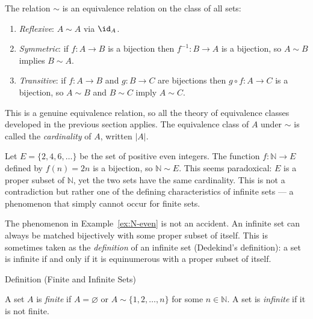 \begin{remark*}
The relation $\sim$ is an equivalence relation on the class of all sets:
\begin{enumerate}[label=(\roman*)]
\item \emph{Reflexive}: $A \sim A$ via $\id_A$.
\item \emph{Symmetric}: if $f : A \to B$ is a bijection then $f^{-1} : B \to A$
is a bijection, so $A \sim B$ implies $B \sim A$.
\item \emph{Transitive}: if $f : A \to B$ and $g : B \to C$ are bijections then
$g \circ f : A \to C$ is a bijection, so $A \sim B$ and $B \sim C$ imply $A \sim C$.
\end{enumerate}
This is a genuine equivalence relation, so all the theory of equivalence classes
developed in the previous section applies. The equivalence class of $A$ under
$\sim$ is called the \emph{cardinality} of $A$, written $|A|$.
\end{remark*}

\begin{example*}
\label{ex:N-even}
Let $E = \{2, 4, 6, \dots\}$ be the set of positive even integers. The
function $f : \mathbb{N} \to E$ defined by $f(n) = 2n$ is a bijection, so
$\mathbb{N} \sim E$. This seems paradoxical: $E$ is a proper subset of
$\mathbb{N}$, yet the two sets have the same cardinality. This is not a
contradiction but rather one of the defining characteristics of infinite sets
--- a phenomenon that simply cannot occur for finite sets.
\end{example*}

\begin{remark*}
The phenomenon in Example~\ref{ex:N-even} is not an accident. An infinite set
can always be matched bijectively with some proper subset of itself. This is
sometimes taken as the \emph{definition} of an infinite set (Dedekind's
definition): a set is infinite if and only if it is equinumerous with a proper
subset of itself.
\end{remark*}


\begin{definitionbox}{Definition (Finite and Infinite Sets)}
\begin{definition}\label{def:finite-infinite}
A set $A$ is \emph{finite} if $A = \varnothing$ or $A \sim \{1, 2, \dots, n\}$
for some $n \in \mathbb{N}$. A set is \emph{infinite} if it is not finite.
\end{definition}
\end{definitionbox}

